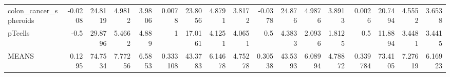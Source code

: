\begin{tabular}{lrrrrrrrrrrrrrrrr}
 colon\_cancer\_spheroids                      &               -0.0208 &          24.8119 &           4.9812  &           3.9806 &         0.0078   &     23.8056 &      4.8791  &     3.8172  &       -0.0378  &   24.876  &    4.9876  &   3.8913  &         0.0026   &     20.7494 &      4.5552  &     3.6538  \\
 pTcells                                     &               -0.5    &          29.8796 &           5.4662  &           4.889  &         1        &     17.0161 &      4.1251  &     4.0651  &        0.5     &    4.3833 &    2.0936  &   1.8125  &         0.5      &     11.8894 &      3.4481  &     3.4415  \\
 MEANS                                       &                0.1295 &          74.7534 &           7.77256 &           6.5853 &         0.333108 &     43.3783 &      6.14678 &     4.75278 &        0.30538 &   43.5393 &    6.08994 &   4.78872 &         0.339784 &     73.4105 &      7.27619 &     6.16923 \\
\hline
\end{tabular}